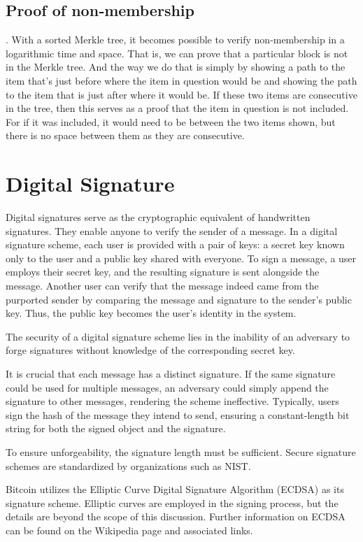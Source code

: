 \documentclass{report}
\begin{document}
\subsection*{Proof of non‐membership}.
With a sorted Merkle tree, it becomes possible to verify non‐membership in a logarithmic time and space. That is, we can prove that a particular block is not in the Merkle tree. And the way we do that is simply by showing a path to the item that’s just before where the item in question would be and showing the path to the item that is just after where it would be. If these two items are consecutive in the tree, then this serves as a proof that the item in question is not included. For if it was included, it would need to be between the two items shown, but there is no space between them as they are consecutive.
\section{Digital Signature}
Digital signatures serve as the cryptographic equivalent of handwritten signatures. They enable anyone to verify the sender of a message. In a digital signature scheme, each user is provided with a pair of keys: a secret key known only to the user and a public key shared with everyone.
To sign a message, a user employs their secret key, and the resulting signature is sent alongside the message. Another user can verify that the message indeed came from the purported sender by comparing the message and signature to the sender's public key. Thus, the public key becomes the user's identity in the system.

The security of a digital signature scheme lies in the inability of an adversary to forge signatures without knowledge of the corresponding secret key.

It is crucial that each message has a distinct signature. If the same signature could be used for multiple messages, an adversary could simply append the signature to other messages, rendering the scheme ineffective. Typically, users sign the hash of the message they intend to send, ensuring a constant-length bit string for both the signed object and the signature.

To ensure unforgeability, the signature length must be sufficient. Secure signature schemes are standardized by organizations such as NIST.

Bitcoin utilizes the Elliptic Curve Digital Signature Algorithm (ECDSA) as its signature scheme. Elliptic curves are employed in the signing process, but the details are beyond the scope of this discussion. Further information on ECDSA can be found on the Wikipedia page and associated links.
\end{document}
